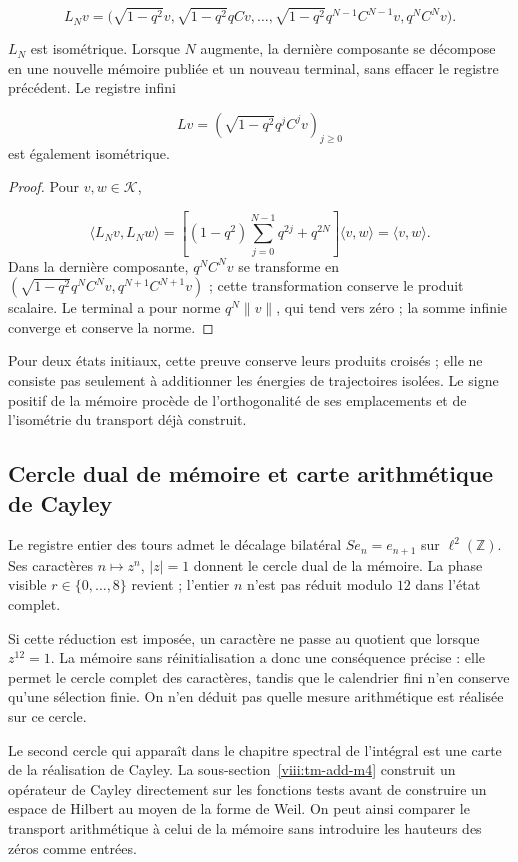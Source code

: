 \[
L_Nv=\bigl(\sqrt{1-q^2}v,
\sqrt{1-q^2}qCv,\ldots,
\sqrt{1-q^2}q^{N-1}C^{N-1}v, q^NC^Nv\bigr).
\]
\begin{proposition}
\label{viii:tm-add-proposicion-costura-2}
\(L_N\) est isométrique. Lorsque \(N\) augmente, la dernière composante se décompose en une nouvelle mémoire publiée et un nouveau terminal, sans effacer le registre précédent. Le registre infini

\[
Lv=\left(\sqrt{1-q^2}q^jC^jv\right)_{j\geq0}
\]
est également isométrique.
\end{proposition}

\begin{proof}
Pour \(v,w\in\mathcal K\),

\[
\langle L_Nv,L_Nw\rangle
=\left[(1-q^2)\sum_{j=0}^{N-1}q^{2j}+q^{2N}\right]
\langle v,w\rangle=\langle v,w\rangle.
\]
Dans la dernière composante, \(q^NC^Nv\) se transforme en \((\sqrt{1-q^2}q^NC^Nv,q^{N+1}C^{N+1}v)\) ; cette transformation conserve le produit scalaire. Le terminal a pour norme \(q^N\|v\|\), qui tend vers zéro ; la somme infinie converge et conserve la norme.
\end{proof}

Pour deux états initiaux, cette preuve conserve leurs produits croisés ; elle ne consiste pas seulement à additionner les énergies de trajectoires isolées. Le signe positif de la mémoire procède de l'orthogonalité de ses emplacements et de l'isométrie du transport déjà construit.


\subsection{Cercle dual de mémoire et carte arithmétique de Cayley}
\label{viii:tm-add-c4}
Le registre entier des tours admet le décalage bilatéral \(Se_n=e_{n+1}\) sur \(\ell^2(\mathbb Z)\). Ses caractères \(n\mapsto z^n\), \(|z|=1\) donnent le cercle dual de la mémoire. La phase visible \(r\in\{0,\ldots,8\}\) revient ; l'entier \(n\) n'est pas réduit modulo \(12\) dans l'état complet.

Si cette réduction est imposée, un caractère ne passe au quotient que lorsque \(z^{12}=1\). La mémoire sans réinitialisation a donc une conséquence précise : elle permet le cercle complet des caractères, tandis que le calendrier fini n'en conserve qu'une sélection finie. On n'en déduit pas quelle mesure arithmétique est réalisée sur ce cercle.

Le second cercle qui apparaît dans le chapitre spectral de l'intégral est une carte de la réalisation de Cayley. La sous-section~\ref{viii:tm-add-m4} construit un opérateur de Cayley directement sur les fonctions tests avant de construire un espace de Hilbert au moyen de la forme de Weil. On peut ainsi comparer le transport arithmétique à celui de la mémoire sans introduire les hauteurs des zéros comme entrées.


